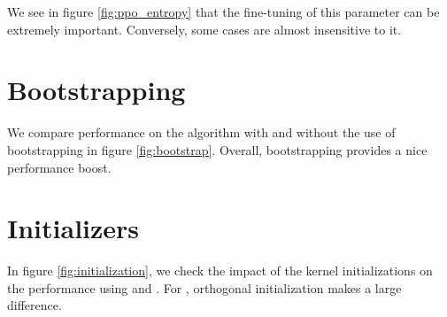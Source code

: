 We see in figure \ref{fig:ppo_entropy} that the fine-tuning of this parameter can be extremely important. Conversely, some cases are almost insensitive to it.



\section{Bootstrapping}

We compare performance on the \ppo algorithm with and without the use of bootstrapping in figure \ref{fig:bootstrap}. Overall, bootstrapping provides a nice performance boost.



\section{Initializers}

In figure \ref{fig:initialization}, we check the impact of the kernel initializations on the performance using \ppo and \sac. For \ppo, orthogonal initialization makes a large difference.



%
%
%
%
%















